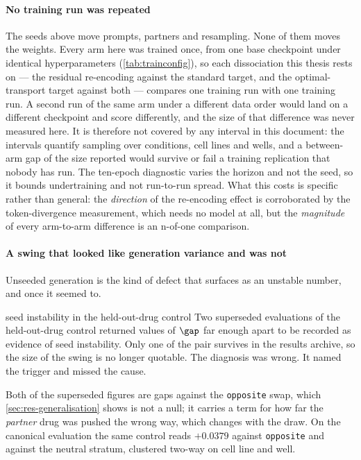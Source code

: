\paragraph{No training run was repeated} The seeds above move prompts,
partners and resampling. None of them moves the weights. Every arm here was
trained once, from one base checkpoint under identical hyperparameters
(\cref{tab:trainconfig}), so each dissociation this thesis rests on --- the
residual re-encoding against the standard target, and the optimal-transport
target against both --- compares one training run with one training run. A
second run of the same arm under a different data order would land on a
different checkpoint and score differently, and the size of that difference was
never measured here. It is therefore not covered by any interval in this
document: the intervals quantify sampling over conditions, cell lines and wells,
and a between-arm gap of the size reported would survive or fail a training
replication that nobody has run. The ten-epoch diagnostic varies the horizon and
not the seed, so it bounds undertraining and not run-to-run spread. What this
costs is specific rather than general: the \emph{direction} of the re-encoding
effect is corroborated by the token-divergence measurement, which needs no
model at all, but the \emph{magnitude} of every arm-to-arm difference is an
n-of-one comparison.

\paragraph{A swing that looked like generation variance and was not} Unseeded
generation is the kind of defect that surfaces as an unstable number, and once
it seemed to.

\begin{withdrawn}{seed instability in the held-out-drug control}
Two superseded evaluations of the held-out-drug control returned values of
$\gap$ far enough apart to be recorded as evidence of seed instability. Only one
of the pair survives in the results archive, so the size of the swing is no
longer quotable. The diagnosis was wrong. It named the trigger and missed the
cause.
\end{withdrawn}

Both of the superseded figures are gaps against the \texttt{opposite} swap, which
\cref{sec:res-generalisation} shows is not a null; it carries a term for how far
the \emph{partner} drug was pushed the wrong way, which changes with the
draw. On the canonical evaluation the same
control reads $+0.0379$ against \texttt{opposite} and
 against the neutral stratum, clustered two-way on
cell line and well.

